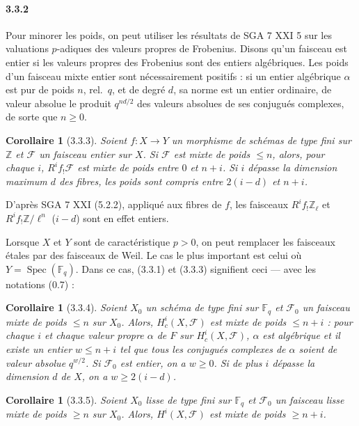 \documentclass[12pt,a4paper]{article}
\theoremstyle{plain}
\newtheorem{corollary}[theorem]{Corollaire}
\theoremstyle{definition}
\theoremstyle{remark}
\DeclareMathOperator{\Spec}{Spec}
\newcommand{\FF}{{\mathbb{F}}}
\newcommand{\ZZ}{{\mathbb{Z}}}
\begin{document}
\paragraph{3.3.2}
Pour minorer les poids, on peut utiliser les r\'esultats de SGA 7 XXI 5 sur les valuations $p$-adiques des valeurs propres de Frobenius. Disons qu'un faisceau est entier si les valeurs propres des Frobenius sont des entiers alg\'ebriques. Les poids d'un faisceau mixte entier sont n\'ecessairement positifs : si un entier alg\'ebrique $\alpha$ est pur de poids $n$, rel.~$q$, et de degr\'e $d$, sa norme est un entier ordinaire, de valeur absolue le produit $q^{nd/2}$ des valeurs absolues de ses conjugu\'es complexes, de sorte que $n \geq 0$.


\begin{corollary}[3.3.3]
Soient $f : X \to Y$ un morphisme de sch\'emas de type fini sur $\ZZ$ et $\mathscr{F}$ un faisceau entier sur $X$. Si $\mathscr{F}$ est mixte de poids $\leq n$, alors, pour chaque $i$, $R^i f_! \mathscr{F}$ est mixte de poids entre $0$ et $n + i$. Si $i$ d\'epasse la dimension maximum $d$ des fibres, les poids sont compris entre $2(i-d)$ et $n + i$.
\end{corollary}

D'apr\`es SGA 7 XXI (5.2.2), appliqu\'e aux fibres de $f$, les faisceaux $R^i f_! \ZZ_\ell$ et $R^i f_! \ZZ/\ell^n$ ($i - d$) sont en effet entiers.

Lorsque $X$ et $Y$ sont de caract\'eristique $p > 0$, on peut remplacer les faisceaux \'etales par des faisceaux de Weil. Le cas le plus important est celui o\`u $Y = \Spec(\FF_q)$. Dans ce cas, (3.3.1) et (3.3.3) signifient ceci --- avec les notations (0.7) :

\begin{corollary}[3.3.4]
Soient $X_0$ un sch\'ema de type fini sur $\FF_q$ et $\mathscr{F}_0$ un faisceau mixte de poids $\leq n$ sur $X_0$. Alors, $H_c^i(X, \mathscr{F})$ est mixte de poids $\leq n + i$ : pour chaque $i$ et chaque valeur propre $\alpha$ de $F$ sur $H_c^i(X, \mathscr{F})$, $\alpha$ est alg\'ebrique et il existe un entier $w \leq n + i$ tel que tous les conjugu\'es complexes de $\alpha$ soient de valeur absolue $q^{w/2}$. Si $\mathscr{F}_0$ est entier, on a $w \geq 0$. Si de plus $i$ d\'epasse la dimension $d$ de $X$, on a $w \geq 2(i-d)$.
\end{corollary}

\begin{corollary}[3.3.5]
Soient $X_0$ lisse de type fini sur $\FF_q$ et $\mathscr{F}_0$ un faisceau lisse mixte de poids $\geq n$ sur $X_0$. Alors, $H^i(X, \mathscr{F})$ est mixte de poids $\geq n + i$.
\end{corollary}
\end{document}
